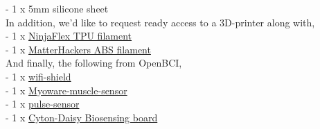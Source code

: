 \documentclass[twoside, 12pt]{article}
\theoremstyle{plain}
\begin{document}
- 1 x 5mm silicone sheet\\
In addition, we'd like to request ready access to a 3D-printer along with,\\
- 1 x \href{https://www.amazon.com/dp/B014KVDXUS/ref=twister_B01LXZYJ3R?_encoding=UTF8&psc=1}{NinjaFlex TPU filament}\\
- 1 x \href{https://www.matterhackers.com/store/l/black-pro-series-abs-filament-175mm-1kg/sk/M6A3VYQ9}{MatterHackers ABS filament}\\
And finally, the following from OpenBCI,\\
- 1 x \href{https://shop.openbci.com/collections/frontpage/products/wifi-shield?variant=44534009550}{wifi-shield}\\
- 1 x \href{https://shop.openbci.com/collections/frontpage/products/myoware-muscle-sensor?variant=29472011267}{Myoware-muscle-sensor}\\
- 1 x \href{https://shop.openbci.com/collections/frontpage/products/pulse-sensor}{pulse-sensor}\\
- 1 x \href{https://shop.openbci.com/collections/frontpage/products/cyton-daisy-biosensing-boards-16-channel?variant=38959256526}{Cyton-Daisy Biosensing board}\\



\end{document}
